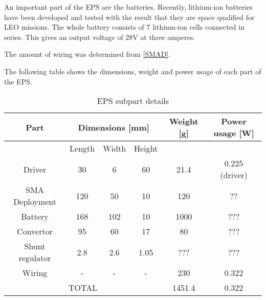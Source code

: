 An important part of the \ac{EPS} are the batteries. Recently, lithium-ion batteries have been developed and tested with the result that they are space qualified for LEO missions. The whole battery consists of 7 lithium-ion cells connected in series. This gives an output voltage of 28V at three amperes.

The amount of wiring was determined from \ref{SMAD}.

The following table shows the dimensions, weight and power usage of each part of the \ac{EPS}.

\begin{table}
\centering
\begin{tabular}{cccccc}
\toprule
Part & \multicolumn{3}{c}{Dimensions [mm]} & Weight [g] & Power usage [W]\\ 
\midrule
 & Length & Width & Height & & \\ 
 Driver & 30 & 6 & 60 & 21.4 & 0.225 (driver) \\ 
 SMA Deployment & 120 & 50 & 10 & 120 & ?? \\ 
 Battery & 168 & 102 & 10 & 1000 & ??? \\ 
 Convertor & 95 & 60 & 17 & 80 & ??? \\ 
 Shunt regulator & 2.8 & 2.6 & 1.05 & ??? & ??? \\ 
 Wiring & - & - & - & 230 & 0.322 \\ 
 \multicolumn{4}{c}{TOTAL} & 1451.4 & 0.322 \\ 
\bottomrule
\end{tabular}
\caption{EPS subpart details}
\label{tab:EPS_details}
\end{table}